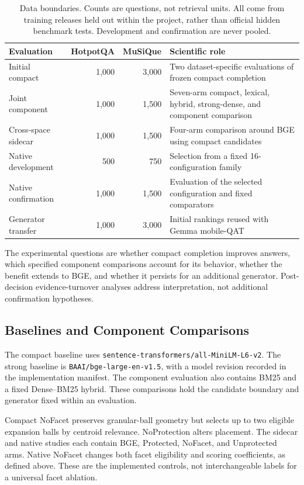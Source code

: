 \documentclass[11pt,a4paper]{article}
\begin{document}
\begin{table}[t]
\centering\small
\begin{tabular}{@{}p{}rrp{}@{}}
\toprule
Evaluation & HotpotQA & MuSiQue & Scientific role\\
\midrule
Initial compact & 1,000 & 3,000 & Two dataset-specific evaluations of frozen compact completion\\
Joint component & 1,000 & 1,500 & Seven-arm compact, lexical, hybrid, strong-dense, and component comparison\\
Cross-space sidecar & 1,000 & 1,500 & Four-arm comparison around BGE using compact candidates\\
Native development & 500 & 750 & Selection from a fixed 16-configuration family\\
Native confirmation & 1,000 & 1,500 & Evaluation of the selected configuration and fixed comparators\\
Generator transfer & 1,000 & 3,000 & Initial rankings reused with Gemma mobile-QAT\\
\bottomrule
\end{tabular}
\caption{Data boundaries. Counts are questions, not retrieval units. All come
from training releases held out within the project, rather than official hidden
benchmark tests. Development and confirmation are never pooled.}
\label{tab:boundaries}
\end{table}

The experimental questions are whether compact completion improves answers,
which specified component comparisons account for its behavior, whether the
benefit extends to BGE, and whether it persists for an additional generator.
Post-decision evidence-turnover analyses address interpretation, not additional
confirmation hypotheses.

\subsection{Baselines and Component Comparisons}
The compact baseline uses \texttt{sentence-transformers/all-MiniLM-L6-v2}.
The strong baseline is \texttt{BAAI/bge-large-en-v1.5}, with a model revision
recorded in the implementation manifest. The component evaluation also
contains BM25 and a fixed Dense--BM25 hybrid. These comparisons hold the
candidate boundary and generator fixed within an evaluation.

Compact NoFacet preserves granular-ball geometry but selects up to two
eligible expansion balls by centroid relevance. NoProtection alters placement.
The sidecar and native studies each contain BGE, Protected, NoFacet, and
Unprotected arms. Native NoFacet changes both facet eligibility and scoring
coefficients, as defined above. These are the implemented controls, not
interchangeable labels for a universal facet ablation.
\end{document}

